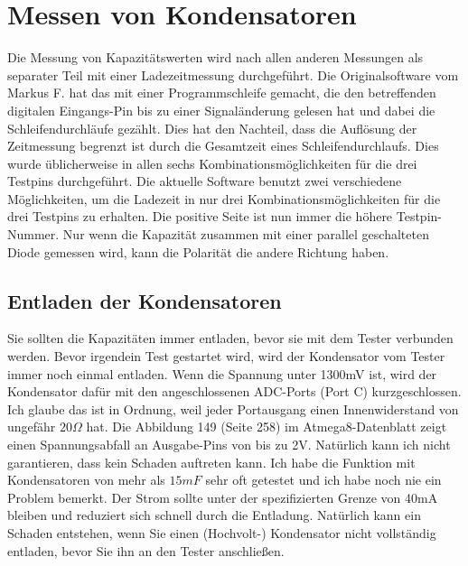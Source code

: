 \section{Messen von Kondensatoren}
Die Messung von Kapazitätswerten wird nach allen anderen Messungen als separater Teil mit einer Ladezeitmessung 
durchgeführt.
Die Originalsoftware vom Markus F. hat das mit einer Programmschleife gemacht, die den betreffenden digitalen
Eingangs-Pin bis zu einer Signaländerung gelesen hat und dabei die Schleifendurchläufe gezählt.
Dies hat den Nachteil, dass die Auflösung der Zeitmessung begrenzt ist durch die Gesamtzeit eines Schleifendurchlaufs.
Dies wurde üblicherweise in allen sechs Kombinationsmöglichkeiten für die drei Testpins durchgeführt.
Die aktuelle Software benutzt zwei verschiedene Möglichkeiten, um die Ladezeit in nur drei
Kombinationsmöglichkeiten für die drei Testpins zu erhalten.
Die positive Seite ist nun immer die höhere Testpin-Nummer.
Nur wenn die Kapazität zusammen mit einer parallel geschalteten Diode gemessen wird,
kann die Polarität die andere Richtung haben.

\subsection{Entladen der Kondensatoren}
Sie sollten die Kapazitäten immer entladen, bevor sie mit dem Tester verbunden werden.
Bevor irgendein Test gestartet wird, wird der Kondensator vom Tester immer noch einmal entladen.
Wenn die Spannung unter 1300mV ist, wird der Kondensator dafür mit den angeschlossenen ADC-Ports (Port C) kurzgeschlossen.
Ich glaube das ist in Ordnung, weil jeder Portausgang einen Innenwiderstand von ungefähr \(20\Omega\) hat.
Die Abbildung 149 (Seite 258) im Atmega8-Datenblatt \cite{ATmega8} zeigt einen Spannungsabfall an Ausgabe-Pins von bis zu 2V.
Natürlich kann ich nicht garantieren, dass kein Schaden auftreten kann.
Ich habe die Funktion mit Kondensatoren von mehr als \(15 mF\) sehr oft getestet und ich habe noch nie ein Problem bemerkt.
Der Strom sollte unter der spezifizierten Grenze von 40mA bleiben und reduziert sich schnell durch die Entladung.
Natürlich kann ein Schaden entstehen, wenn Sie einen (Hochvolt-) Kondensator nicht vollständig entladen, bevor Sie ihn an den Tester anschließen.


